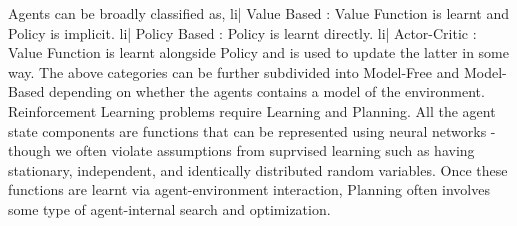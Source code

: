 Agents can be broadly classified as,
li| Value Based : Value Function is learnt and Policy is implicit.
li| Policy Based : Policy is learnt directly.
li| Actor-Critic : Value Function is learnt alongside Policy and is used to update the latter in some way.
The above categories can be further subdivided into Model-Free and Model-Based depending on whether the agents contains a model of the environment.
Reinforcement Learning problems require Learning and Planning. All the agent state components are functions that can be represented using neural networks - though we often violate assumptions from suprvised learning such as having stationary, independent, and identically distributed random variables. Once these functions are learnt via agent-environment interaction, Planning often involves some type of agent-internal search and optimization.
